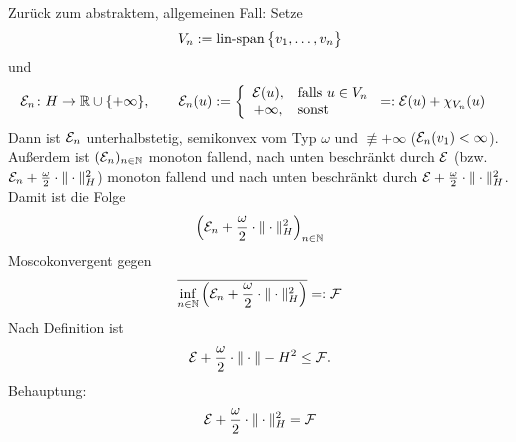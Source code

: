 Zurück zum abstraktem, allgemeinen Fall:
Setze
\begin{align*}
	V_n:=\operatorname{lin-span}\big\lbrace v_1,\ldots,v_n\big\rbrace
\end{align*}
und
\begin{align*}
	\mathcal{E}_n&\colon H\to\mathbb{R}\cup\lbrace+\infty\rbrace,\qquad
	\mathcal{E}_n(u):=\left\lbrace\begin{array}{cl}
		\mathcal{E}(u) ,&\text{falls } u\in V_n\\
		+\infty, &\text{sonst }
	\end{array}\right.
	=:\mathcal{E}(u)+\chi_{V_n}(u)
\end{align*}
Dann ist $\mathcal{E}_n$ unterhalbstetig, semikonvex vom Typ $\omega$ und $\not\equiv+\infty$ ($\mathcal{E}_n(v_1)<\infty$).
Außerdem ist $(\mathcal{E}_n)_{n\in\mathbb{N}}$ monoton fallend, nach unten beschränkt durch $\mathcal{E}$ 
(bzw. $\mathcal{E}_n+\frac{\omega}{2}\cdot\Vert\cdot\Vert_H^2$) monoton fallend und nach unten beschränkt durch $\mathcal{E}+\frac{\omega}{2}\cdot\Vert\cdot\Vert_H^2$.
Damit ist die Folge
\begin{align*}
	\left(\mathcal{E}_n+\frac{\omega}{2}\cdot\Vert\cdot\Vert_H^2\right)_{n\in\mathbb{N}}
\end{align*}
Moscokonvergent gegen 
\begin{align*}
	\overline{\inf\limits_{n\in\mathbb{N}}\left(\mathcal{E}_n+\frac{\omega}{2}\cdot\Vert\cdot\Vert_H^2\right)}=:\mathcal{F}
\end{align*}
Nach Definition ist 
\begin{align*}
	\mathcal{E}+\frac{\omega}{2}\cdot\Vert\cdot\Vert-H^2\leq \mathcal{F}.
\end{align*}
Behauptung:
\begin{align*}
	\mathcal{E}+\frac{\omega}{2}\cdot\Vert\cdot\Vert_H^2=\mathcal{F}
\end{align*}


